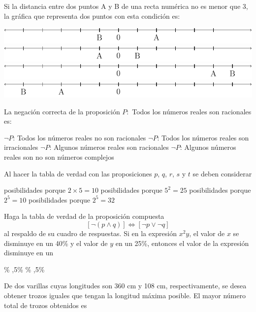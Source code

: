 \documentclass[10pt,letterpaper,addpoints]{exam}
\begin{document}
\begin{multicols}{2}
\begin{questions}
\begin{oneparchoices}
\end{oneparchoices}
\question Si la distancia entre dos puntos A y B de una recta numérica no es menor que 3, la gráfica que representa dos puntos con esta condición es:

\begin{choices}
\CorrectChoice \includegraphics[scale=.5]{Images/respA.pdf} 
\choice \includegraphics[scale=.5]{Images/respB.pdf} 
\choice \includegraphics[scale=.5]{Images/respC.pdf} 
\choice \includegraphics[scale=.5]{Images/respD.pdf} 
  \end{choices}
  \question
  La negación correcta de la proposición $P:$ Todos los números reales son racionales es:
  \begin{choices}
  \choice $\neg P$: Todos los números reales no son racionales
  \choice $\neg P$: Todos los números reales son irracionales
  \CorrectChoice $\neg P$: Algunos números reales son racionales
  \choice $\neg P$: Algunos números reales son no son números complejos 
\end{choices}  
\question Al hacer la tabla de verdad con las proposiciones $p$, $q$, $r$, $s$ y $t$ se deben considerar
\begin{choices}
 posibilidades porque $2\times 5=10$
 posibilidades porque $5^{2}=25$
 posibilidades porque $2^{5}=10$
 posibilidades porque $2^{5}=32$
\end{choices}
\question Haga la tabla de verdad de la proposición compuesta 
\[[\neg(p\wedge q)]\Longleftrightarrow [\neg p \vee \neg q]\]
al respaldo de su cuadro de respuestas.
\question
Si en la expresión $ x^2y $, el valor de $ x $ se disminuye en un 40\% y el valor de $ y $ en un 25\%, entonces el valor de la expresión disminuye en un

\begin{oneparchoices}
\% ,5\% \% ,5\%
\end{oneparchoices}
\question
De dos varillas cuyas longitudes son 360 cm y 108 cm, respectivamente, se desea obtener trozos iguales que tengan la longitud máxima posible. El mayor número total de trozos obtenidos es


\end{questions}
\end{multicols}
\end{document}
